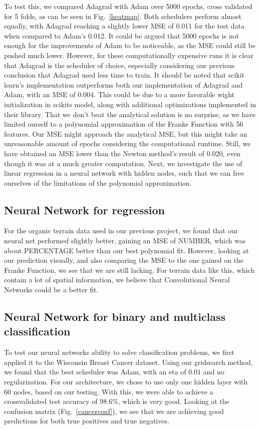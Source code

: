 \documentclass[onecolumn,10pt,cleanfoot]{asme2ej}
\begin{document}
To test this, we compared Adagrad with Adam over 5000 epochs, cross validated for 5 folds, as can be seen in Fig.~\ref{heatmap}. Both schedulers perform almost equally, with Adagrad reaching a slightly lower MSE of 0.011 for the test data when compared to Adam's 0.012. It could be argued that 5000 epochs is not enough for the improvements of Adam to be noticeable, as the MSE could still be pushed much lower. However, for these computationally expensive runs it is clear that Adagrad is the scheduler of choice, especially considering our previous conclusion that Adagrad used less time to train. It should be noted that scikit learn's implementation outperforms both our implementation of Adagrad and Adam, with an MSE of 0.004. This could be due to a more favorable wight initialization in scikits model, along with additional optimizations implemented in their library. That we don't beat the analytical solution is no surprise, as we have limited ourself to a polynomial approximation of the Franke Function with 56 features. Our MSE might approach the analytical MSE, but this might take an unreasonable amount of epochs considering the computational runtime. Still, we have obtained an MSE lower than the Newton method's result of 0.020, even though it was at a much greater computation. Next, we investigate the use of linear regression in a neural network with hidden nodes, such that we can free ourselves of the limitations of the polynomial approximation.

\subsection{Neural Network for regression}

For the organic terrain data used in our previous project, we found that our neural net performed slightly better, gaining an MSE of NUMBER, which was about PERCENTAGE better than our best polynomial fit. However, looking at our prediction visually, and also comparing the MSE to the one gained on the Franke Function, we see that we are still lacking. For terrain data like this, which contain a lot of spatial information, we believe that Convolutional Neural Networks could be a better fit.

\subsection{Neural Network for binary and multiclass classification}

To test our neural networks ability to solve classification problems, we first applied it to the Wisconsin Breast Cancer dataset. Using our gridsearch method, we found that the best scheduler was Adam, with an eta of $0.01$ and no regularization. For our architecture, we chose to use only one hidden layer with 60 nodes, based on our testing. With this, we were able to achieve a crossvalidated test accuracy of $98.6 \%$, which is very good. Looking at the confusion matrix (Fig.~\ref{cancerconf}), we see that we are achieving good predictions for both true positives and true negatives.
\end{document}

